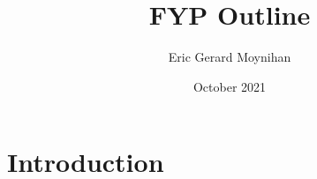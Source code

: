 \documentclass{article}
\title{FYP Outline}
\author{Eric Gerard Moynihan}
\date{October 2021}
\begin{document}
\maketitle

\section{Introduction}
\end{document}
